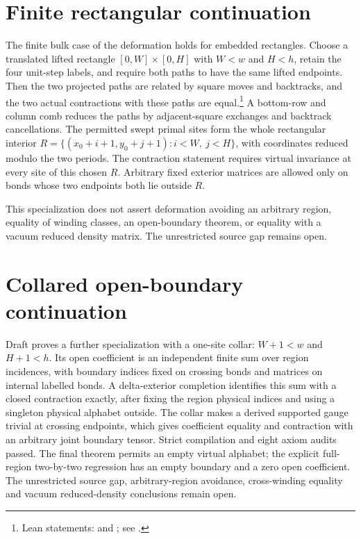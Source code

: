 \documentclass{article}
\begin{document}
\section{Finite rectangular continuation}
The finite bulk case of the deformation holds for embedded rectangles.
Choose a translated lifted rectangle $[0,W]\times[0,H]$ with $W<w$ and
$H<h$, retain the four unit-step labels, and require both paths to have
the same lifted endpoints. Then the two projected paths are related by
square moves and backtracks, and the two actual contractions with these
paths are equal.\footnote{Lean statements:
 and
;
see .}
A bottom-row and column comb reduces the
paths by adjacent-square exchanges and backtrack cancellations.
The permitted swept primal sites form the whole rectangular interior
$R=\{(x_0+i+1,y_0+j+1):i<W,\ j<H\}$, with coordinates reduced modulo
the two periods. The contraction statement requires virtual invariance
at every site of this chosen $R$. Arbitrary fixed exterior matrices are
allowed only on bonds whose two endpoints both lie outside $R$.

This specialization does not assert deformation avoiding an arbitrary
region, equality of winding classes, an open-boundary theorem, or equality
with a vacuum reduced density matrix. The unrestricted source gap remains open.

\section{Collared open-boundary continuation}
Draft  proves a further specialization with a one-site collar:
$W+1<w$ and $H+1<h$. Its open coefficient is an independent finite
sum over region incidences, with boundary indices fixed on crossing bonds
and matrices on internal labelled bonds. A delta-exterior completion identifies this sum with a closed contraction
exactly, after fixing the region physical indices and using a singleton
physical alphabet outside.
The collar makes a derived supported gauge trivial at crossing endpoints,
which gives coefficient equality and contraction with an arbitrary
joint boundary tensor. Strict compilation and eight axiom audits passed.
The final theorem permits an empty virtual alphabet; the explicit full-region
two-by-two regression has an empty boundary and a zero open coefficient. The unrestricted
source gap, arbitrary-region avoidance, cross-winding equality and vacuum
reduced-density conclusions remain open.
\end{document}
